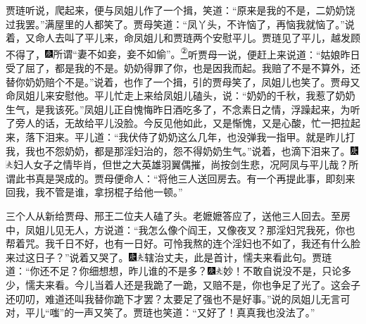 贾琏听说，爬起来，便与凤姐儿作了一个揖，笑道：``原来是我的不是，二奶奶饶过我罢。''满屋里的人都笑了。贾母笑道：``凤丫头，不许恼了，再恼我就恼了。''说着，又命人去叫了平儿来，命凤姐儿和贾琏两个安慰平儿。贾琏见了平儿，越发顾不得了，{\includegraphics[width=3mm]{../Images/00004}所谓``妻不如妾，妾不如偷''。}\href{../Text/part0048_split_000.html\#lnkback_2_a}{\textsuperscript{②}}听贾母一说，便赶上来说道：``姑娘昨日受了屈了，都是我的不是。奶奶得罪了你，也是因我而起。我赔了不是不算外，还替你奶奶赔个不是。''说着，也作了一个揖，引的贾母笑了，凤姐儿也笑了。贾母又命凤姐儿来安慰他。平儿忙走上来给凤姐儿磕头，说：``奶奶的千秋，我惹了奶奶生气，是我该死。''凤姐儿正自愧悔昨日酒吃多了，不念素日之情，浮躁起来，为听了旁人的话，无故给平儿没脸。今反见他如此，又是惭愧，又是心酸，忙一把拉起来，落下泪来。平儿道：``我伏侍了奶奶这么几年，也没弹我一指甲。就是昨儿打我，我也不怨奶奶，都是那淫妇治的，怨不得奶奶生气。''说着，也滴下泪来了。{\includegraphics[width=3mm]{../Images/00004}\includegraphics[width=3mm]{../Images/00012}\footnotesize \kaishu 妇人女子之情毕肖，但世之大英雄羽翼偶摧，尚按剑生悲，况阿凤与平儿哉？所谓此书真是哭成的。}贾母便命人：``将他三人送回房去。有一个再提此事，即刻来回我，我不管是谁，拿拐棍子给他一顿。''

三个人从新给贾母、邢王二位夫人磕了头。老嬷嬷答应了，送他三人回去。至房中，凤姐儿见无人，方说道：``我怎么像个阎王，又像夜叉？那淫妇咒我死，你也帮着咒。我千日不好，也有一日好。可怜我熬的连个淫妇也不如了，我还有什么脸来过这日子？''说着又哭了。{\includegraphics[width=3mm]{../Images/00004}\includegraphics[width=3mm]{../Images/00012}\footnotesize \kaishu 辖治丈夫，此是首计，懦夫来看此句。}贾琏道：``你还不足？你细想想，昨儿谁的不是多？{\includegraphics[width=3mm]{../Images/00004}\includegraphics[width=3mm]{../Images/00012}\footnotesize \kaishu 妙！不敢自说没不是，只论多少，懦夫来看。}今儿当着人还是我跪了一跪，又赔不是，你也争足了光了。这会子还叨叨，难道还叫我替你跪下才罢？太要足了强也不是好事。''说的凤姐儿无言可对，平儿``嗤''的一声又笑了。贾琏也笑道：``又好了！真真我也没法了。''

